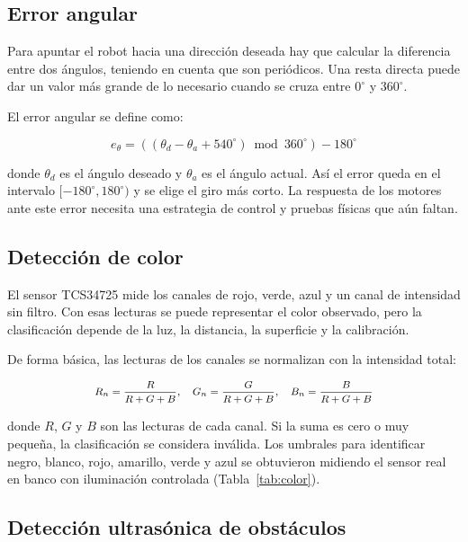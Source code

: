 \documentclass[journal]{IEEEtran}
\begin{document}
\subsection{Error angular}

Para apuntar el robot hacia una dirección deseada hay que calcular la diferencia entre dos ángulos, teniendo en cuenta que son periódicos. Una resta directa puede dar un valor más grande de lo necesario cuando se cruza entre $0^\circ$ y $360^\circ$.

El error angular se define como:

\begin{equation}
e_\theta =
\left((\theta_d-\theta_a+540^\circ)
\bmod 360^\circ\right)-180^\circ
\label{eq:error_angular}
\end{equation}

donde $\theta_d$ es el ángulo deseado y $\theta_a$ es el ángulo actual. Así el error queda en el intervalo $[-180^\circ,180^\circ)$ y se elige el giro más corto. La respuesta de los motores ante este error necesita una estrategia de control y pruebas físicas que aún faltan.

\subsection{Detección de color}

El sensor TCS34725 mide los canales de rojo, verde, azul y un canal de intensidad sin filtro. Con esas lecturas se puede representar el color observado, pero la clasificación depende de la luz, la distancia, la superficie y la calibración.

De forma básica, las lecturas de los canales se normalizan con la intensidad total:

\begin{equation}
\medmath{
R_n=\frac{R}{R+G+B},\quad
G_n=\frac{G}{R+G+B},\quad
B_n=\frac{B}{R+G+B}}
\label{eq:normalizacion_color}
\end{equation}

donde $R$, $G$ y $B$ son las lecturas de cada canal. Si la suma es cero o muy pequeña, la clasificación se considera inválida. Los umbrales para identificar negro, blanco, rojo, amarillo, verde y azul se obtuvieron midiendo el sensor real en banco con iluminación controlada (Tabla~\ref{tab:color}).

\subsection{Detección ultrasónica de obstáculos}
\end{document}
